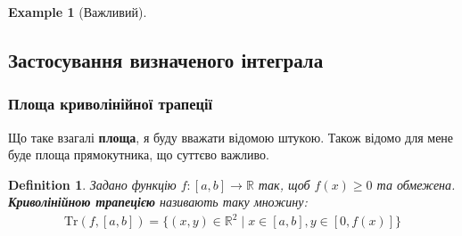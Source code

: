 \documentclass[a4paper, 10pt]{article}
\theoremstyle{theoremdd}
\theoremstyle{theoremdd}
\theoremstyle{theoremdd}
\newtheorem{definition}[theorem]{Definition}
\theoremstyle{theoremdd}
\theoremstyle{theoremdd}
\newtheorem{example}[theorem]{Example}
\theoremstyle{theoremdd}
\theoremstyle{theoremdd}
\theoremstyle{theoremdd}
\theoremstyle{theoremdd}
\begin{document}
\begin{example}[Важливий]
\iffalse
На цьому не все. Ясно, що справедлива нерівність $\sin^{2n+1} x < \sin^{2n}x < \sin^{2n-1}x, \forall n \geq 1$. Звідси за нерівністю інтегралів\\
$I_{2n+1} < I_{2n} < I_{2n-1}$.\\
Використовуючи отримані формули, буде така нерівність:\\
$\dfrac{(2n)!!}{(2n+1)!!} < \dfrac{(2n-1)!!}{(2n)!!} \dfrac{\pi}{2} < \dfrac{(2n-2)!!}{(2n-1)!!}$\\
$\dfrac{(2n)!!}{(2n-1)!!} \dfrac{1}{2n+1} < \dfrac{(2n-1)!!}{(2n)!!} \dfrac{\pi}{2} < \dfrac{(2n)!!}{(2n-1)!!} \dfrac{1}{2n}$\\
$\left( \dfrac{(2n)!!}{(2n-1)!!} \right)^2 \dfrac{1}{2n+1} < \dfrac{\pi}{2} < \left(\dfrac{(2n)!!}{(2n-1)!!}\right)^2 \dfrac{1}{2n}$\\
$0 < \dfrac{\pi}{2} - \left( \dfrac{(2n)!!}{(2n-1)!!} \right)^2 \dfrac{1}{2n+1} < \dfrac{\pi}{2} < \left(\dfrac{(2n)!!}{(2n-1)!!} \right)^2 \dfrac{1}{2n} - \left( \dfrac{(2n)!!}{(2n-1)!!} \right)^2 \dfrac{1}{2n+1} = \left( \dfrac{(2n)!!}{(2n-1)!!} \right)^2 \dfrac{1}{2n(2n+1)} $
\fi
\end{example}

\subsection{Застосування визначеного інтеграла}
\subsubsection{Площа криволінійної трапеції}
Що таке взагалі \textbf{площа}, я буду вважати відомою штукою. Також відомо для мене буде площа прямокутника, що суттєво важливо.

\begin{definition}
Задано функцію $f \colon [a,b] \to \mathbb{R}$ так, щоб $f(x) \geq 0$ та обмежена.\\
\textbf{Криволінійною трапецією} називають таку множину:
\begin{align*}
\text{Tr}(f,[a,b]) = \{(x,y) \in \mathbb{R}^2 \mid x \in [a,b], y \in [0, f(x)] \}
\end{align*}
\begin{figure}[H]
\centering
{}
\end{figure}
\end{definition}
\end{document}
